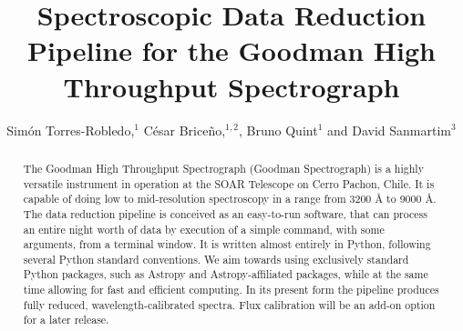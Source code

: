\documentclass[11pt,twoside]{article}
\begin{document}
\title{Spectroscopic Data Reduction Pipeline for the Goodman High Throughput Spectrograph}

\author{Sim\'on Torres-Robledo,$^1$ C\'esar Brice\~no,$^{1, 2}$, Bruno Quint$^1$ and David Sanmartim$^3$
}


\begin{abstract}
The Goodman High Throughput Spectrograph (Goodman Spectrograph) is a highly
versatile instrument in operation at the SOAR Telescope on Cerro Pachon, Chile.
It is capable of doing low to mid-resolution spectroscopy in a range from 3200 \AA{}
to 9000 \AA{}. The data reduction pipeline is conceived as an easy-to-run software,
that can process an entire night worth of data by execution of a simple command,
with some arguments, from a terminal window. It is written almost entirely in
Python, following several Python standard conventions.
We aim towards using exclusively standard Python packages, such as Astropy and
Astropy-affiliated packages, while at the same time allowing for fast and
efficient computing.
In its present form the pipeline produces fully reduced, wavelength-calibrated
spectra. Flux calibration will be an add-on option for a later release.
\end{abstract}
\end{document}

